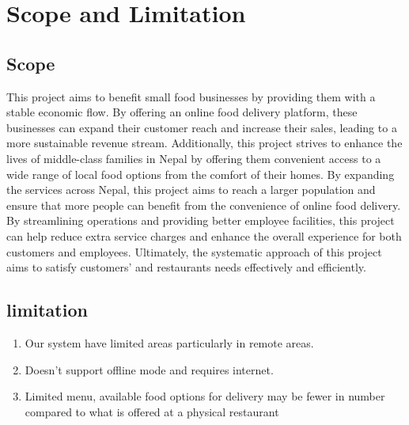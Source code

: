 \section{Scope and Limitation}
\subsection{Scope}
This project aims to benefit small food businesses by providing them with a stable economic flow. By offering an online food delivery platform, these businesses can expand their customer reach and increase their sales, leading to a more sustainable revenue stream. Additionally, this project strives to enhance the lives of middle-class families in Nepal by offering them convenient access to a wide range of local food options from the comfort of their homes. By expanding the services across Nepal, this project aims to reach a larger population and ensure that more people can benefit from the convenience of online food delivery. By streamlining operations and providing better employee facilities, this project can help reduce extra service charges and enhance the overall experience for both customers and employees. Ultimately, the systematic approach of this project aims to satisfy customers' and restaurants needs effectively and efficiently.

\subsection{limitation}
\begin{enumerate}
\item Our system have limited areas particularly in remote areas.
\item Doesn’t support offline mode and requires internet.
\item Limited menu, available food options for delivery may be fewer in number compared to what is offered at a physical restaurant
\end{enumerate}

